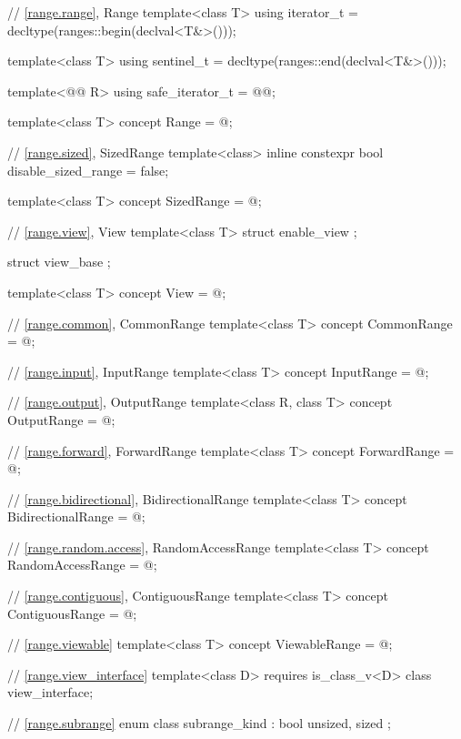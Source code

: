 \begin{addedblock}
\begin{codeblock}
{  // \ref{range.range}, Range
  template<class T>
    using iterator_t = decltype(ranges::begin(declval<T&>()));

  template<class T>
    using sentinel_t = decltype(ranges::end(declval<T&>()));

  template<@@ R>
    using safe_iterator_t = @@;

  template<class T>
    concept Range = @\seebelownc@;

  // \ref{range.sized}, SizedRange
  template<class>
    inline constexpr bool disable_sized_range = false;

  template<class T>
    concept SizedRange = @\seebelownc@;

  // \ref{range.view}, View
  template<class T>
  struct enable_view { };

  struct view_base { };

  template<class T>
    concept View = @\seebelownc@;

  // \ref{range.common}, CommonRange
  template<class T>
    concept CommonRange = @\seebelownc@;

  // \ref{range.input}, InputRange
  template<class T>
    concept InputRange = @\seebelownc@;

  // \ref{range.output}, OutputRange
  template<class R, class T>
    concept OutputRange = @\seebelownc@;

  // \ref{range.forward}, ForwardRange
  template<class T>
    concept ForwardRange = @\seebelownc@;

  // \ref{range.bidirectional}, BidirectionalRange
  template<class T>
    concept BidirectionalRange = @\seebelownc@;

  // \ref{range.random.access}, RandomAccessRange
  template<class T>
    concept RandomAccessRange = @\seebelownc@;

  // \ref{range.contiguous}, ContiguousRange
  template<class T>
    concept ContiguousRange = @\seebelownc@;

  // \ref{range.viewable}
  template<class T>
    concept ViewableRange = @\seebelownc@;

  // \ref{range.view_interface}
  template<class D>
    requires is_class_v<D>
  class view_interface;

  // \ref{range.subrange}
  enum class subrange_kind : bool { unsized, sized };

}
\end{codeblock}
\end{addedblock}

